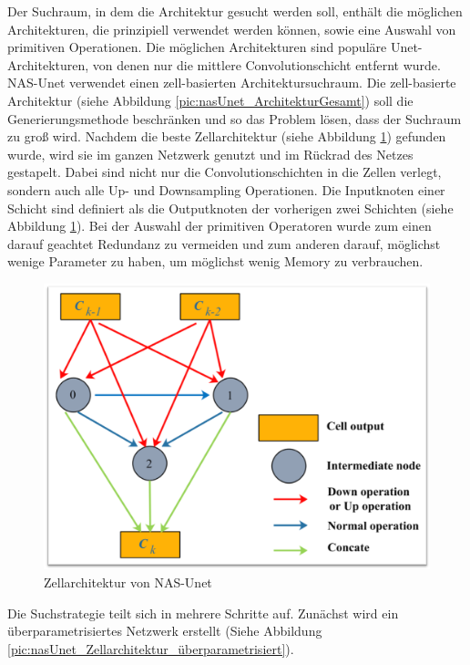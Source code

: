 Der Suchraum, in dem die Architektur gesucht werden soll, enthält die möglichen Architekturen, die prinzipiell verwendet werden können, sowie eine Auswahl von primitiven Operationen. Die möglichen Architekturen sind populäre Unet-Architekturen, von denen nur die mittlere Convolutionschicht entfernt wurde. 
NAS-Unet verwendet einen zell-basierten Architektursuchraum. Die zell-basierte Architektur (siehe Abbildung \ref{pic:nasUnet_ArchitekturGesamt}) soll die Generierungsmethode beschränken und so das Problem lösen, dass der Suchraum zu groß wird. Nachdem die beste Zellarchitektur (siehe Abbildung \ref{pic:nasUnet_Zellarchitektur}) gefunden wurde, wird sie im ganzen Netzwerk genutzt und im Rückrad des Netzes gestapelt. Dabei sind nicht nur die Convolutionschichten in die Zellen verlegt, sondern auch alle Up- und Downsampling Operationen. Die Inputknoten einer Schicht sind definiert als die Outputknoten der vorherigen zwei Schichten (siehe Abbildung \ref{pic:nasUnet_Zellarchitektur}). 
Bei der Auswahl der primitiven Operatoren wurde zum einen darauf geachtet Redundanz zu vermeiden und zum anderen darauf, möglichst wenige Parameter zu haben, um möglichst wenig Memory zu verbrauchen. 

\begin{figure}[H]
	
	\centering
	\includegraphics[scale=0.30]{Pictures/nasUnet/Bild2.png}
	\caption{Zellarchitektur von NAS-Unet \cite{nasunetPaper} }
	\label{pic:nasUnet_Zellarchitektur}
\end{figure}

Die Suchstrategie teilt sich in mehrere Schritte auf. Zunächst wird ein überparametrisiertes Netzwerk erstellt (Siehe Abbildung \ref{pic:nasUnet_Zellarchitektur_überparametrisiert}).

